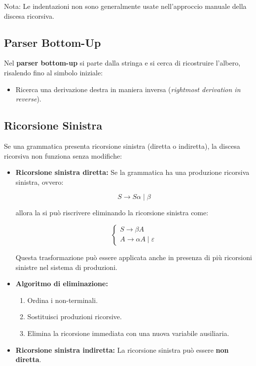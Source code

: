 Nota: Le indentazioni non sono generalmente usate nell'approccio manuale della discesa ricorsiva.


\subsection{Parser Bottom-Up}
Nel \textbf{parser bottom-up} si parte dalla stringa e si cerca di ricostruire l’albero, risalendo fino al simbolo iniziale:
\begin{itemize}
    \item Ricerca una derivazione destra in maniera inversa (\emph{rightmost derivation in reverse}).
\end{itemize}

\subsection{Ricorsione Sinistra}
Se una grammatica presenta ricorsione sinistra (diretta o indiretta), la discesa ricorsiva non funziona senza modifiche:
\begin{itemize}
    \item \textbf{Ricorsione sinistra diretta:} Se la grammatica ha una produzione ricorsiva sinistra, ovvero:
        
\[
    S \rightarrow S \alpha \mid \beta
    \]
    
    allora la si può riscrivere eliminando la ricorsione sinistra come:
    
    \[
    \begin{cases}
    S \rightarrow \beta A \\
    A \rightarrow \alpha A \mid \varepsilon 
    \end{cases}
    \]

    Questa trasformazione può essere applicata anche in presenza di più ricorsioni sinistre nel sistema di produzioni.

    \item \textbf{Algoritmo di eliminazione:}
    \begin{enumerate}
        \item Ordina i non-terminali.
        \item Sostituisci produzioni ricorsive.
        \item Elimina la ricorsione immediata con una nuova variabile ausiliaria.
    \end{enumerate}

    \item \textbf{Ricorsione sinistra indiretta:} La ricorsione sinistra può essere \textbf{non diretta}.
    \end{itemize}       
